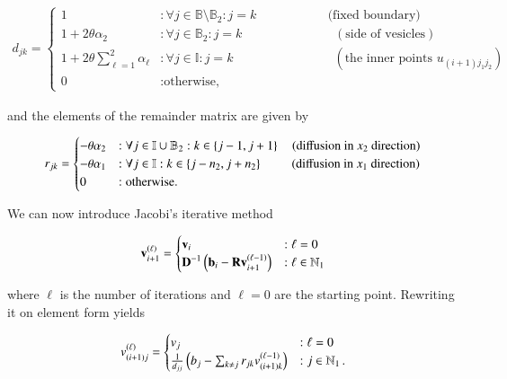 \documentclass[11pt,english,a4paper]{article}
\begin{document}
\begin{flushleft}
\begin{align}
d_{jk} = \begin{cases} 
1 &:\forall j\in\mathbb{B}\setminus\mathbb{B}_2  : j=k \,\,\,\,\quad\qquad\qquad \text{(fixed boundary)}\\
1+ 2\theta \alpha_2 &: \forall j\in\mathbb{B}_2: j=k \,\,\quad\qquad\qquad\qquad (\text{side of vesicles}) \\ 
1+ 2\theta \sum_{\ell = 1}^2 \alpha_\ell &: \forall j\in\mathbb{I}: j=k \qquad\qquad\qquad\qquad (\text{the inner points }u_{(i+1)j_1j_2}) \\ 
 0 & : \text{otherwise,} \end{cases}
\label{eq_21}
\end{align}

and the elements of the remainder matrix are given by

\begin{align}
r_{jk} = \begin{cases} 
-\theta \alpha_2 &: \forall j\in\mathbb{I}\cup\mathbb{B}_2: k\in\left\lbrace{j-1,j+1}\right\rbrace\quad \text{(diffusion in $x_2$ direction)} \\ 
- \theta \alpha_1 &: \forall j\in\mathbb{I} : k \in \left\lbrace{j-n_2,j+n_2}\right\rbrace \,\,\qquad\text{(diffusion in $x_1$ direction)} \\
 0 & : \text{otherwise.} \end{cases}
\label{eq_22}
\end{align}

We can now introduce Jacobi's iterative method

\begin{align*}
\textbf{v}_{i+1}^{(\ell)} = \begin{cases}
\textbf{v}_i &: \ell=0 \\
\textbf{D}^{-1}\left({\textbf{b}_i-\textbf{R}\textbf{v}_{i+1}^{(\ell-1)}}\right) &: \ell\in\mathbb{N}_1
\end{cases}
\end{align*}

where $\ell$ is the number of iterations and $\ell=0$ are the starting point. Rewriting it on element form yields

\begin{align*}
v_{(i+1)j}^{(\ell)} = \begin{cases} v_j &: \ell = 0 \\ \frac{1}{d_{jj}}\left({b_j - \sum_{k\neq j} r_{jk} v_{(i+1)k}^{(\ell-1)}}\right) &: j\in\mathbb{N}_1 \,.\end{cases}
\end{align*}


\end{flushleft}
\end{document}
